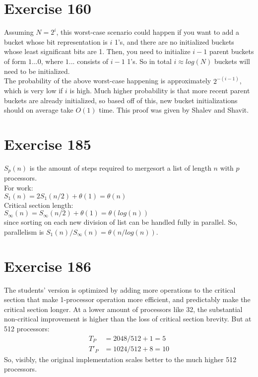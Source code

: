 \documentclass{article}
\begin{document}
\begin{adjustwidth}{-2cm}{-2cm}
\section{Exercise 160}
Assuming $N = 2^{i}$, this worst-case scenario could happen if you want to add a bucket whose bit representation is $i$ 1's, and there are no initialized buckets whose least significant bits are 1. Then, you need to initialize $i-1$ parent buckets of form $1...0$, where $1...$ consists of $i-1$ 1's. So in total $i \approx log(N)$ buckets will need to be initialized.\\
The probability of the above worst-case happening is approximately $2^{-(i-1)}$, which is very low if $i$ is high. Much higher probability is that more recent parent buckets are already initialized, so based off of this, new bucket initializations should on average take $O(1)$ time. This proof was given by Shalev and Shavit.
\section{Exercise 185}
$S_{p}(n)$ is the amount of steps required to mergesort a list of length $n$ with $p$ processors.\\
For work:\\
$S_{1}(n) = 2S_{1}(n/2)+\theta(1) = \theta(n)$\\
Critical section length:\\
$S_{\infty}(n) = S_{\infty}(n/2)+\theta(1) = \theta(log(n))$\\
since sorting on each new division of list can be handled fully in parallel.
So, parallelism is $S_{1}(n)/S_{\infty}(n) = \theta(n/log(n))$.
\section{Exercise 186}
The students' version is optimized by adding more operations to the critical section that make 1-processor operation more efficient, and predictably make the critical section longer. At a lower amount of processors like 32, the substantial non-critical improvement is higher than the loss of critical section brevity. But at 512 processors:\begin{align*}
    T_{P} &= 2048/512 + 1 = 5\\
    T'_{P} &= 1024/512 + 8 = 10
\end{align*}
So, visibly, the original implementation scales better to the much higher 512 processors.

\end{adjustwidth}
\end{document}
